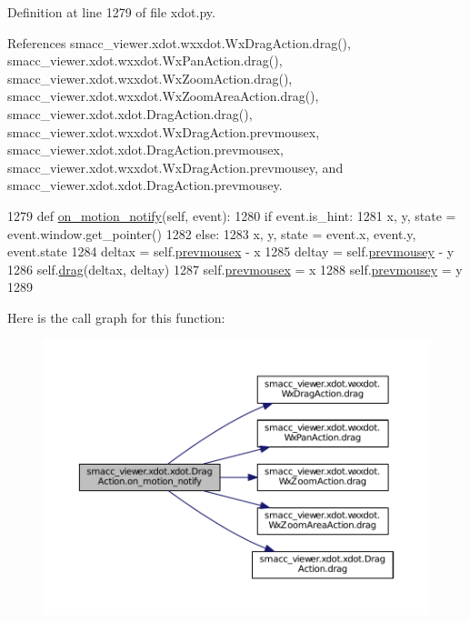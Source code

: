 Definition at line 1279 of file xdot.\+py.



References smacc\+\_\+viewer.\+xdot.\+wxxdot.\+Wx\+Drag\+Action.\+drag(), smacc\+\_\+viewer.\+xdot.\+wxxdot.\+Wx\+Pan\+Action.\+drag(), smacc\+\_\+viewer.\+xdot.\+wxxdot.\+Wx\+Zoom\+Action.\+drag(), smacc\+\_\+viewer.\+xdot.\+wxxdot.\+Wx\+Zoom\+Area\+Action.\+drag(), smacc\+\_\+viewer.\+xdot.\+xdot.\+Drag\+Action.\+drag(), smacc\+\_\+viewer.\+xdot.\+wxxdot.\+Wx\+Drag\+Action.\+prevmousex, smacc\+\_\+viewer.\+xdot.\+xdot.\+Drag\+Action.\+prevmousex, smacc\+\_\+viewer.\+xdot.\+wxxdot.\+Wx\+Drag\+Action.\+prevmousey, and smacc\+\_\+viewer.\+xdot.\+xdot.\+Drag\+Action.\+prevmousey.


\begin{DoxyCode}
1279     \textcolor{keyword}{def }\hyperlink{classsmacc__viewer_1_1xdot_1_1xdot_1_1DragAction_a8df007cdc9b3a4de2481be8895dc64bf}{on\_motion\_notify}(self, event):
1280         \textcolor{keywordflow}{if} event.is\_hint:
1281             x, y, state = event.window.get\_pointer()
1282         \textcolor{keywordflow}{else}:
1283             x, y, state = event.x, event.y, event.state
1284         deltax = self.\hyperlink{classsmacc__viewer_1_1xdot_1_1xdot_1_1DragAction_ae2f5ec580e06a106adc68228092ee823}{prevmousex} - x
1285         deltay = self.\hyperlink{classsmacc__viewer_1_1xdot_1_1xdot_1_1DragAction_a6380280846ff6f59ec6283e10c01a293}{prevmousey} - y
1286         self.\hyperlink{classsmacc__viewer_1_1xdot_1_1xdot_1_1DragAction_afb7edc5dd321770d1d9c52ba2d69c9d9}{drag}(deltax, deltay)
1287         self.\hyperlink{classsmacc__viewer_1_1xdot_1_1xdot_1_1DragAction_ae2f5ec580e06a106adc68228092ee823}{prevmousex} = x
1288         self.\hyperlink{classsmacc__viewer_1_1xdot_1_1xdot_1_1DragAction_a6380280846ff6f59ec6283e10c01a293}{prevmousey} = y
1289 
\end{DoxyCode}


Here is the call graph for this function\+:
\nopagebreak
\begin{figure}[H]
\begin{center}
\leavevmode
\includegraphics[width=350pt]{classsmacc__viewer_1_1xdot_1_1xdot_1_1DragAction_a8df007cdc9b3a4de2481be8895dc64bf_cgraph}
\end{center}
\end{figure}


